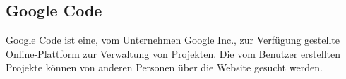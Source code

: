 \subsection{Google Code}
Google Code ist eine, vom Unternehmen Google Inc., zur Verfügung gestellte Online-Plattform zur Verwaltung von Projekten. Die vom Benutzer erstellten Projekte können von anderen Personen über die Website gesucht werden. 
